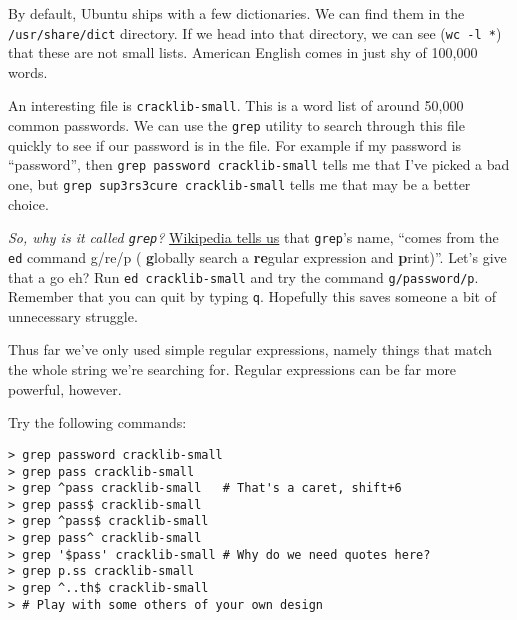 \documentclass{article}
\begin{document}
\begin{minipage}{0.6\textwidth}
By default, Ubuntu ships with a few dictionaries. We can find them in the
\texttt{/usr/share/dict} directory. If we head into that directory, we can see
(\texttt{wc~-l~*}) that these are not small lists. American English comes in
just shy of 100,000 words.

\medskip
\noindent
An interesting file is \texttt{cracklib-small}. This is a word list of around
50,000 common passwords. We can use the \texttt{grep} utility to search
through this file quickly to see if our password is in the file. For example
if my password is ``password'', then \texttt{grep~password~cracklib-small} tells
me that I've picked a bad one, but \texttt{grep~sup3rs3cure~cracklib-small}
tells me that may be a better choice.


\medskip \noindent \textit{So, why is it called \texttt{grep}?}
\href{https://en.wikipedia.org/wiki/Grep}{Wikipedia tells us} that
\texttt{grep}'s name, ``comes from the \texttt{ed} command g/re/p ({\bf
g}lobally search a {\bf re}gular expression and {\bf p}rint)''. Let's give
that a go eh?  Run \texttt{ed~cracklib-small} and try the command
\texttt{g/password/p}. Remember that you can quit by typing \texttt{q}.
Hopefully this saves someone a bit of unnecessary struggle.

\medskip
\noindent
Thus far we've only used simple regular expressions, namely things that match
the whole string we're searching for. Regular expressions can be far more
powerful, however.

\medskip
\noindent
Try the following commands:
\begin{lstlisting}
> grep password cracklib-small
> grep pass cracklib-small
> grep ^pass cracklib-small   # That's a caret, shift+6
> grep pass$ cracklib-small
> grep ^pass$ cracklib-small
> grep pass^ cracklib-small
> grep '$pass' cracklib-small # Why do we need quotes here?
> grep p.ss cracklib-small
> grep ^..th$ cracklib-small
> # Play with some others of your own design
\end{lstlisting}


\end{minipage}
\begin{minipage}{0.05\textwidth}
  ~~~~
\end{minipage}
\end{document}

